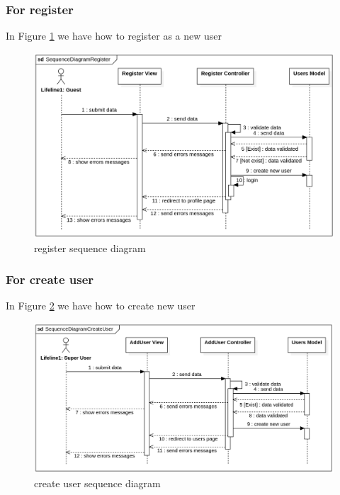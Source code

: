 \documentclass[12pt,a4paper]{article}
\begin{document}
		\subsubsection{For register}
		In Figure \ref{fig:register-s-d} we have how to register as a new user
		
			\begin{figure}[b]
				\centering
				\includegraphics[width=\textwidth]{diagrams/register_sequence.png}
				\caption{register sequence diagram}
				\label{fig:register-s-d}
			\end{figure}
	
		\subsubsection{For create user}
		In Figure \ref{fig:user-create-s-d} we have how to create new user
		
			\begin{figure}[b]
				\centering
				\includegraphics[width=\textwidth]{diagrams/user_create_sequence.png}
				\caption{create user sequence diagram}
				\label{fig:user-create-s-d}
			\end{figure}
		
\end{document}
